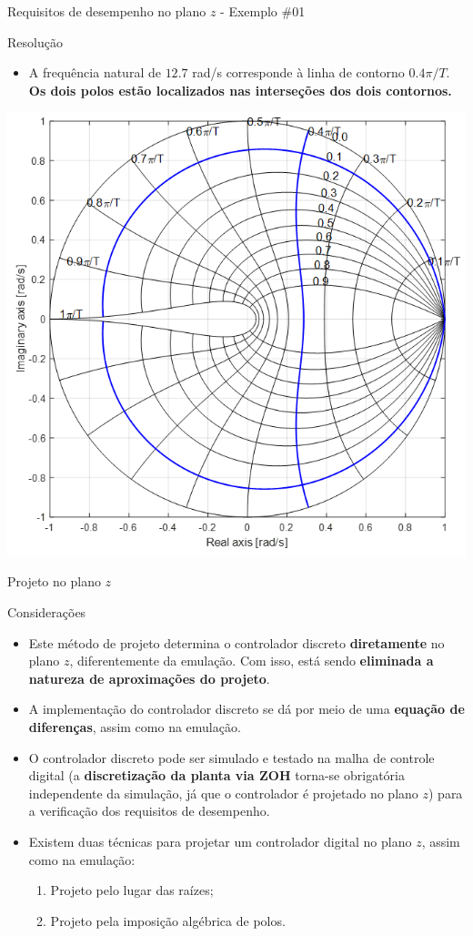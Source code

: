 \begin{frame}{Requisitos de desempenho no plano $z$ - Exemplo \#01}
\begin{block}{Resolução}
\begin{itemize}
    \item A frequência natural de $\num{12,7}$ rad/s corresponde à linha de contorno $\num{0,4}\pi/T$. \textbf{Os dois polos estão localizados nas interseções dos dois contornos.}
\end{itemize}
\end{block}
\centerline{\includegraphics[width=0.48\linewidth]{Figuras/Ch11/fig6.png}}
\end{frame}

\begin{frame}{Projeto no plano $z$}
\begin{block}{Considerações}
\begin{itemize}
    \item Este método de projeto determina o controlador discreto \textbf{diretamente} no plano $ z $, diferentemente da emulação. Com isso, está sendo \textbf{eliminada a natureza de aproximações do projeto}.
    \item A implementação do controlador discreto se dá por meio de uma \textbf{equação de diferenças}, assim como na emulação.
    \item O controlador discreto pode ser simulado e testado na malha de controle digital (a \textbf{discretização da planta via ZOH} torna-se obrigatória independente da simulação, já que o controlador é projetado no plano $z$) para a verificação dos requisitos de desempenho.
    \item Existem duas técnicas para projetar um controlador digital no plano $z$, assim como na emulação:
    \begin{enumerate}
        \item Projeto pelo lugar das raízes;
        \item Projeto pela imposição algébrica de polos.
    \end{enumerate}
\end{itemize}
\end{block}
\end{frame}

